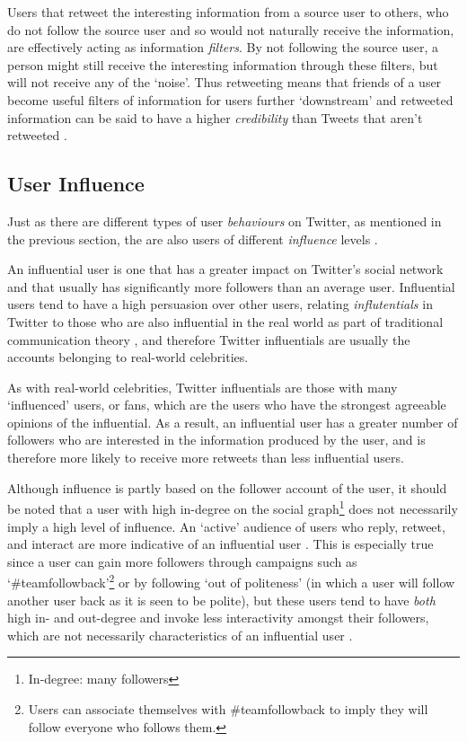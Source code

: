 Users that retweet the interesting information from a source user to others, who do not follow the source user and so would not naturally receive the information, are effectively acting as information \textit{filters}. By not following the source user, a person might still receive the interesting information through these filters, but will not receive any of the `noise'. Thus retweeting means that friends of a user become useful filters of information for users further `downstream'  and retweeted information can be said to have a higher \textit{credibility} than Tweets that aren't retweeted \cite{castillo11}.


\subsection{User Influence}
Just as there are different types of user \textit{behaviours} on Twitter, as mentioned in the previous section, the are also users of different \textit{influence} levels \cite{quercia11}.

An influential user is one that has a greater impact on Twitter's social network \cite{bakshy11} and that usually has significantly more followers than an average user. Influential users tend to have a high persuasion over other users, relating \textit{influtentials} in Twitter to those who are also influential in the real world as part of traditional communication theory \cite{cha10}, and therefore Twitter influentials are usually the accounts belonging to real-world celebrities.

As with real-world celebrities, Twitter influentials are those with many `influenced' users, or fans, which are the users who have the strongest agreeable opinions of the influential. As a result, an influential user has a greater number of followers who are interested in the information produced by the user, and is therefore more likely to receive more retweets than less influential users.

Although influence is partly based on the follower account of the user, it should be noted that a user with high in-degree on the social graph\footnote{In-degree: many followers} does not necessarily imply a high level of influence. An `active' audience of users who reply, retweet, and interact are more indicative of an influential user \cite{bigonha10}. This is especially true since a user can gain more followers through campaigns such as `\#teamfollowback'\footnote{Users can associate themselves with \#teamfollowback to imply they will follow everyone who follows them.} or by following `out of politeness' (in which a user will follow another user back as it is seen to be polite), but these users tend to have \textit{both} high in- and out-degree and invoke less interactivity amongst their followers, which are not necessarily characteristics of an influential user \cite{cha10}.

